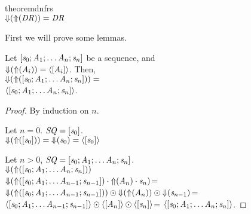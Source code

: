 \begin{restatable}{theorem}{dnfrs}\leavevmode\\
\label{thm:soundness-dnf-lenses}
$\mathit{\Downarrow}(\mathit{\Uparrow}(\mathit{DR})) = \mathit{DR}$
\end{restatable}
First we will prove some lemmas.
\begin{lemma}
\label{lem:sequence-rx}
Let $[\mathit{s}_0;\mathit{A}_1;
\ldots\mathit{A}_n;\mathit{s}_n]$ be a sequence,
and\\
$\mathit{\Downarrow}(\mathit{\Uparrow}(\mathit{A}_i))=\langle[\mathit{A}_i]\rangle$.
Then,\\$\mathit{\Downarrow}(\mathit{\Uparrow}([\mathit{s}_0;\mathit{A}_1;
\ldots\mathit{A}_n;\mathit{s}_n]))=$\\
$\langle[\mathit{s}_0;\mathit{A}_1;
\ldots\mathit{A}_n;\mathit{s}_n]\rangle$.
\end{lemma}
\begin{proof}
By induction on $n$.

Let $n=0$.
$\mathit{SQ}=[\mathit{s}_0]$.\\
$\mathit{\Downarrow}(\mathit{\Uparrow}([\mathit{s}_0]))=
\mathit{\Downarrow}(\mathit{s}_0)=\langle[\mathit{s}_0]\rangle$

Let $n>0$,
$\mathit{SQ}=[\mathit{s}_0;\mathit{A}_1;
\ldots\mathit{A}_n;\mathit{s}_n]$.\\
$\mathit{\Downarrow}(\mathit{\Uparrow}([\mathit{s}_0;\mathit{A}_1;
\ldots\mathit{A}_n;\mathit{s}_n]))$\\
$\mathit{\Downarrow}(\mathit{\Uparrow}([\mathit{s}_0;\mathit{A}_1;
\ldots\mathit{A}_{n-1};\mathit{s}_{n-1}])\cdot\mathit{\Uparrow}(\mathit{A}_n)
\cdot\mathit{s}_n)$=\\
$\mathit{\Downarrow}(\mathit{\Uparrow}([\mathit{s}_0;\mathit{A}_1;
\ldots\mathit{A}_{n-1};\mathit{s}_{n-1}]))
\odot\\
\mathit{\Downarrow}(\mathit{\Uparrow}(\mathit{A}_n))
\odot\\
\mathit{\Downarrow}(\mathit{s}_{n-1})$=
$\langle[\mathit{s}_0;\mathit{A}_1;
\ldots\mathit{A}_{n-1};\mathit{s}_{n-1}]\rangle
\odot\\
\langle[\mathit{A}_n]\rangle
\odot
\langle[\mathit{s}_n]\rangle$=
$\langle[\mathit{s}_0;\mathit{A}_1;
\ldots\mathit{A}_n;\mathit{s}_n]\rangle$.
\end{proof}



